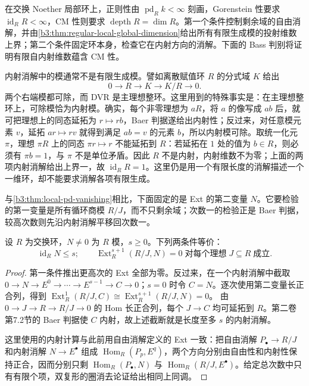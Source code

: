 在交换 Noether 局部环上，正则性由 \(\operatorname{pd}_Rk<\infty\) 刻画，Gorenstein 性要求 \(\operatorname{id}_RR<\infty\)，CM 性则要求 \(\operatorname{depth}R=\dim R\)。第一个条件控制剩余域的自由消解，并由\cref{b3:thm:regular-local-global-dimension}给出所有有限生成模的投射维数上界；第二个条件固定环本身，检查它在内射方向的消解。下面的 Bass 判别将证明有限自内射维数蕴含 CM 性。

\ProseParagraphBreak
内射消解中的模通常不是有限生成模。譬如离散赋值环 \(R\) 的分式域 \(K\) 给出
\[
	0\longrightarrow R\longrightarrow K\longrightarrow K/R\longrightarrow0.
\]
两个右端模都可除，而 DVR 是主理想整环。这里用到的特殊事实是：在主理想整环上，可除模恰为内射模。确实，每个非零理想为 \(aR\)，将 \(a\) 的像写成 \(ab\) 后，就可把理想上的同态延拓为 \(r\mapsto rb\)，Baer 判据遂给出内射性；反过来，对任意模元素 \(v\)，延拓 \(ar\mapsto rv\) 就得到满足 \(ab=v\) 的元素 \(b\)，所以内射模可除。取统一化元 \(\pi\)，理想 \(\pi R\) 上的同态 \(\pi r\mapsto r\) 不能延拓到 \(R\)：若延拓在 \(1\) 处的值为 \(b\in R\)，则必须有 \(\pi b=1\)，与 \(\pi\) 不是单位矛盾。因此 \(R\) 不是内射，内射维数不为零；上面的两项内射消解给出上界一，故 \(\operatorname{id}_RR=1\)。这里仍是用一个有限长度的消解描述一个一维环，却不能要求消解各项有限生成。

\ProseParagraphBreak
与\cref{b3:thm:local-pd-vanishing}相比，下面固定的是 Ext 的第二变量 \(N\)。它要检验的第一变量是所有循环商模 \(R/J\)，而不只剩余域；次数一的检验正是 Baer 判据，较高次数则先沿内射消解平移回次数一。

\begin{lemma}\label{b3:lem:injective-dimension-test}
	设 \(R\) 为交换环，\(N\ne0\) 为 \(R\) 模，\(s\ge0\)。下列两条件等价：
	\[
		\operatorname{id}_RN\le s;\qquad \operatorname{Ext}_R^{s+1}(R/J,N)=0 \;\text{对每个理想}\;J\subseteq R\;\text{成立}.
	\]
\end{lemma}
\begin{proof}
	第一条件推出更高次的 Ext 全部为零。反过来，在一个内射消解中截取 \(0\to N\to E^0\to\cdots\to E^{s-1}\to C\to0\)；\(s=0\) 时令 \(C=N\)。逐次使用第二变量长正合列，得到 \(\operatorname{Ext}_R^1(R/J,C)\cong\operatorname{Ext}_R^{s+1}(R/J,N)=0\)。 由 \(0\to J\to R\to R/J\to0\) 的 Hom 长正合列，每个 \(J\to C\) 均可延拓到 \(R\)。第二卷第7.2节的 Baer 判据使 \(C\) 内射，故上述截断就是长度至多 \(s\) 的内射消解。

	这里使用的内射计算与此前用自由消解定义的 Ext 一致：把自由消解 \(P_\bullet\to R/J\) 和内射消解 \(N\to E^\bullet\) 组成 \(\operatorname{Hom}_R(P_p,E^q)\)，两个方向分别由自由性和内射性保持正合，因而分别只剩 \(\operatorname{Hom}_R(P_\bullet,N)\) 与 \(\operatorname{Hom}_R(R/J,E^\bullet)\)。给定总次数中只有有限个项，双复形的圈消去论证给出相同上同调。
\end{proof}

